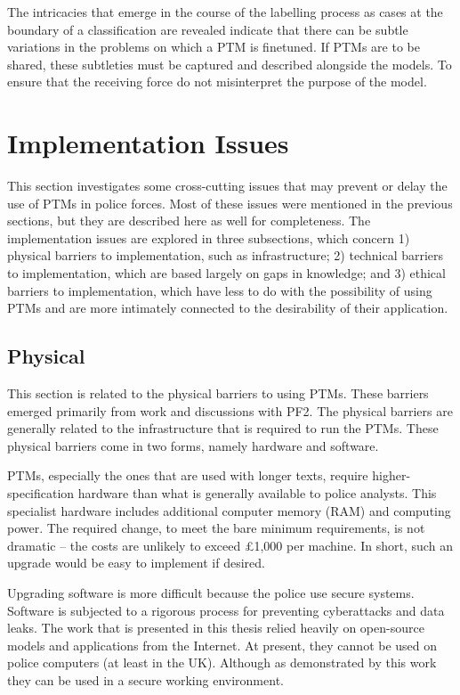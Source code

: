 The intricacies that emerge in the course of the labelling process as cases at the boundary of a classification are revealed indicate that there can be subtle variations in the problems on which a PTM is finetuned. If PTMs are to be shared, these subtleties must be captured and described alongside the models. To ensure that the receiving force do not misinterpret the purpose of the model.

\section{Implementation Issues} This section investigates some cross-cutting issues that may prevent or delay the use of PTMs in police forces. Most of these issues were mentioned in the previous sections, but they are described here as well for completeness. The implementation issues are explored in three subsections, which concern 1) physical barriers to implementation, such as infrastructure; 2) technical barriers to implementation, which are based largely on gaps in knowledge; and 3) ethical barriers to implementation, which have less to do with the possibility of using PTMs and are more intimately connected to the desirability of their application. 

\subsection{Physical} This section is related to the physical barriers to using PTMs. These barriers emerged primarily from work and discussions with PF2. The physical barriers are generally related to the infrastructure that is required to run the PTMs. These physical barriers come in two forms, namely hardware and software.

PTMs, especially the ones that are used with longer texts, require higher-specification hardware than what is generally available to police analysts. This specialist hardware includes additional computer memory (RAM) and computing power. The required change, to meet the bare minimum requirements, is not dramatic – the costs are unlikely to exceed £1,000 per machine. In short, such an upgrade would be easy to implement if desired. 

Upgrading software is more difficult because the police use secure systems. Software is subjected to a rigorous process for preventing cyberattacks and data leaks. The work that is presented in this thesis relied heavily on open-source models and applications from the Internet. At present, they cannot be used on police computers (at least in the UK). Although as demonstrated by this work they can be used in a secure working environment.

